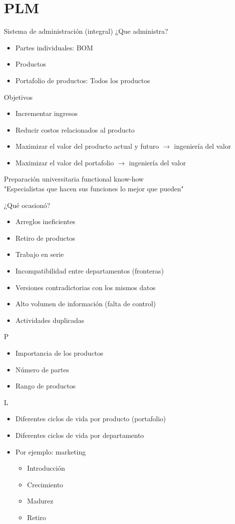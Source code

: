 \section{PLM}

Sistema de administración (integral)
¿Que administra?
\begin{itemize}
    \item Partes individuales: BOM
    \item Productos 
    \item Portafolio de productos: Todos los productos
\end{itemize}

Objetivos 
\begin{itemize}
    \item Incrementar ingresos
    \item Reducir costos relacionados al producto
    \item Maximizar el valor del producto actual y futuro \( \to \) ingeniería del valor
    \item Maximizar el valor del portafolio \( \to \) ingeniería del valor
\end{itemize}

Preparación universitaria functional know-how \\
"Especialistas que hacen sus funciones lo mejor que pueden"

¿Qué ocasionó?
\begin{itemize}
    \item Arreglos ineficientes
    \item Retiro de productos 
    \item Trabajo en serie 
    \item Incompatibilidad entre departamentos (fronteras)
    \item Versiones contradictorias con los mismos datos
    \item Alto volumen de información (falta de control)
    \item Actividades duplicadas
\end{itemize}

P
\begin{itemize}
    \item Importancia de los productos
    \item Número de partes
    \item Rango de productos
\end{itemize}

L
\begin{itemize}
    \item Diferentes ciclos de vida por producto (portafolio)
    \item Diferentes ciclos de vida por departamento
    \item Por ejemplo: marketing
    \begin{itemize}
        \item Introducción 
        \item Crecimiento
        \item Madurez 
        \item Retiro
    \end{itemize}
\end{itemize}

